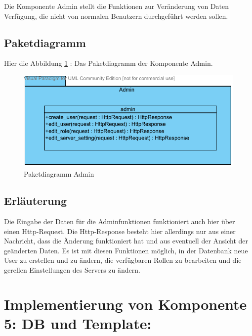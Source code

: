 
Die Komponente Admin stellt die Funktionen zur Veränderung von Daten Verfügung,
die nicht von normalen Benutzern durchgeführt werden sollen.

\subsection{Paketdiagramm}
Hier die Abbildung \ref{fig:PDadmin} : Das Paketdiagramm der Komponente Admin.
\begin{figure}[!htb]
\includegraphics[width=0.8\linewidth]{bilder/Paketdiagramm_admin.pdf}
\caption{Paketdiagramm Admin}
\label{fig:PDadmin}
\end{figure}
\subsection{Erl\"auterung}
Die Eingabe der Daten für die Adminfunktionen funktioniert auch hier über
einen Http-Request. Die Http-Response besteht hier allerdings nur aus einer
Nachricht, dass die Änderung funktioniert hat und aus eventuell der Ansicht der
geänderten Daten. Es ist mit diesen Funktionen möglich, in der Datenbank neue
User zu erstellen und zu ändern, die verfügbaren Rollen zu bearbeiten und die
gerellen Einstellungen des Servers zu ändern. 

\section{Implementierung von Komponente
         5: DB und Template:}


